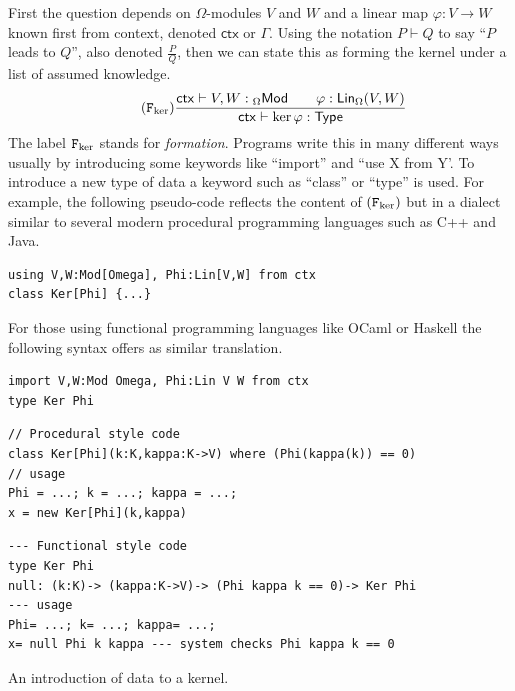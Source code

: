 \documentclass[12pt,twoside,dvipsnames,letterpaper]{memoir}
\begin{document}
First the question depends on $\Omega$-modules $V$ and $W$ and a linear map $\varphi:V\to W$ 
known first from context, denoted $\mathsf{ctx}$ or $\Gamma$.  Using the notation 
$P\vdash Q$ to say ``$P$ leads to $Q$'', also denoted $\frac{P}{Q}$, then we can 
state this as forming the kernel under a list of assumed knowledge.
\begin{gather}
    \tag{$\form{\ker}$}
    \frac{
        \mathsf{ctx} \vdash V,W:{_{\Omega} \mathsf{Mod}}\qquad
        \varphi:\mathsf{Lin}_{\Omega}(V,W)
    }{
        \mathsf{ctx}\vdash \ker\varphi:\mathsf{Type}
    }
\end{gather}
The label $\mathtt{F}_{\ker}$ stands for \emph{formation}.  Programs write this in
many different ways usually by introducing some keywords like ``import''
and ``use X from Y'.  To introduce a new type of data a keyword such as ``class''
or ``type'' is used.  For example, the following pseudo-code reflects the 
content of $(\mathtt{F}_{\ker})$ but in a dialect similar to several modern 
procedural programming 
languages such as C++ and Java.
\begin{lstlisting}[language=Sava]
using V,W:Mod[Omega], Phi:Lin[V,W] from ctx
class Ker[Phi] {...}
\end{lstlisting}
For those using functional programming languages like OCaml or Haskell the following syntax offers 
as similar translation.
\begin{lstlisting}[language=Hidris]
import V,W:Mod Omega, Phi:Lin V W from ctx
type Ker Phi
\end{lstlisting}



\begin{lstfloat}[!htbp]
\begin{lstlisting}[language=Sava]
// Procedural style code
class Ker[Phi](k:K,kappa:K->V) where (Phi(kappa(k)) == 0)
// usage 
Phi = ...; k = ...; kappa = ...;
x = new Ker[Phi](k,kappa)
\end{lstlisting}
\begin{lstlisting}[language=Hidris]
--- Functional style code
type Ker Phi
null: (k:K)-> (kappa:K->V)-> (Phi kappa k == 0)-> Ker Phi
--- usage 
Phi= ...; k= ...; kappa= ...;
x= null Phi k kappa --- system checks Phi kappa k == 0
\end{lstlisting}    
\caption{An introduction of data to a kernel.}
\label{lst:kernel-intro}
\end{lstfloat}
    
\end{document}
